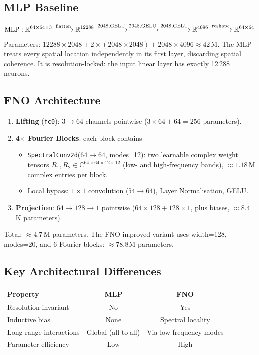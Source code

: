 \documentclass[11pt,a4paper]{article}
\begin{document}
\subsection{MLP Baseline}
\[
  \text{MLP}: \mathbb{R}^{64\times64\times3} \xrightarrow{\rm flatten} \mathbb{R}^{12288}
  \xrightarrow{2048,\text{GELU}} \xrightarrow{2048,\text{GELU}} \xrightarrow{2048,\text{GELU}}
  \mathbb{R}^{4096} \xrightarrow{\rm reshape} \mathbb{R}^{64\times64}
\]
Parameters: $12288{\times}2048 + 2{\times}(2048{\times}2048) + 2048{\times}4096 \approx 42$\,M. The MLP treats every spatial location independently in its first layer, discarding spatial coherence. It is resolution-locked: the input linear layer has exactly 12\,288 neurons.

\subsection{FNO Architecture}
\begin{enumerate}[nosep]
  \item \textbf{Lifting} (\texttt{fc0}): $3\to64$ channels pointwise ($3\times64 + 64 = 256$ parameters).
  \item \textbf{4$\times$ Fourier Blocks}: each block contains
    \begin{itemize}[nosep]
      \item \texttt{SpectralConv2d}($64\to64$, modes=12): two learnable complex weight tensors $R_1,R_2\in\mathbb{C}^{64\times64\times12\times12}$ (low- and high-frequency bands), $\approx 1.18$\,M complex entries per block.
      \item Local bypass: $1\times1$ convolution ($64\to64$), Layer Normalisation, GELU.
    \end{itemize}
  \item \textbf{Projection}: $64\to128\to1$ pointwise ($64\times128 + 128\times1$, plus biases, $\approx 8.4$\,K parameters).
\end{enumerate}
Total: $\approx 4.7$\,M parameters. The FNO improved variant uses width=128, modes=20, and 6 Fourier blocks: $\approx78.8$\,M parameters.

\subsection{Key Architectural Differences}
\begin{center}
\begin{tabular}{lcc}
\toprule
Property & MLP & FNO \\
\midrule
Resolution invariant & No & Yes \\
Inductive bias & None & Spectral locality \\
Long-range interactions & Global (all-to-all) & Via low-frequency modes \\
Parameter efficiency & Low & High \\
\bottomrule
\end{tabular}
\end{center}
\end{document}
